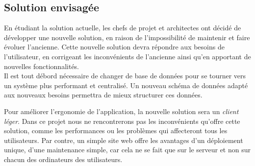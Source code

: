 \subsection{Solution envisagée}

En étudiant la solution actuelle, les chefs de projet et architectes ont décidé de développer une nouvelle solution, en raison de l'impossibilité de maintenir et faire évoluer l'ancienne.
Cette nouvelle solution devra répondre aux besoins de l'utilisateur, en corrigeant les inconvénients de l'ancienne ainsi qu'en apportant de nouvelles fonctionnalités.
\\

Il est tout débord nécessaire de changer de base de données pour se tourner vers un système plus performant et centralisé.
Un nouveau schéma de données adapté aux nouveaux besoins permettra de mieux structurer ces données.

Pour améliorer l'ergonomie de l'application, la nouvelle solution sera un \textit{client léger}.
Dans ce projet nous ne rencontrerons pas les inconvénients qu'offre cette solution, comme les performances ou les problèmes qui affecteront tous les utilisateurs.
Par contre, un simple site web offre les avantages d'un déploiement unique, d'une maintenance simple, car cela ne se fait que sur le serveur et non sur chacun des ordinateurs des utilisateurs.